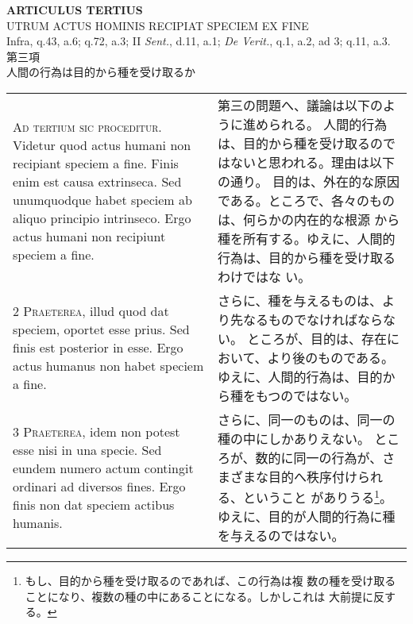 \documentclass[10pt]{jsarticle} %
\begin{document}
\begin{center}
 {\Large {\bf ARTICULUS TERTIUS}}\\
 {\large UTRUM ACTUS HOMINIS RECIPIAT SPECIEM EX FINE}\\
 {\footnotesize Infra, q.43, a.6; q.72, a.3; II {\itshape Sent.}, d.11,
 a.1; {\itshape De Verit.}, q.1, a.2, ad 3; q.11, a.3.}\\
 {\Large 第三項\\人間の行為は目的から種を受け取るか}
\end{center}

\begin{longtable}{p{21em}p{21em}}


{\Huge A}{\scshape d tertium sic proceditur}. Videtur quod
actus humani non recipiant speciem a fine. Finis enim est causa
extrinseca. Sed unumquodque habet speciem ab aliquo principio
intrinseco. Ergo actus humani non recipiunt speciem a fine.

&

第三の問題へ、議論は以下のように進められる。
人間的行為は、目的から種を受け取るのではないと思われる。理由は以下の通り。
目的は、外在的な原因である。ところで、各々のものは、何らかの内在的な根源
 から種を所有する。ゆえに、人間的行為は、目的から種を受け取るわけではな
 い。

\\


{\scshape 2 Praeterea}, illud quod dat speciem,
oportet esse prius. Sed finis est posterior in esse. Ergo actus humanus
non habet speciem a fine.

&


さらに、種を与えるものは、より先なるものでなければならない。
ところが、目的は、存在において、より後のものである。
ゆえに、人間的行為は、目的から種をもつのではない。

\\


{\scshape 3 Praeterea}, idem non potest esse nisi in
una specie. Sed eundem numero actum contingit ordinari ad diversos
fines. Ergo finis non dat speciem actibus humanis.

&

さらに、同一のものは、同一の種の中にしかありえない。
ところが、数的に同一の行為が、さまざまな目的へ秩序付けられる、ということ
 がありうる\footnote{もし、目的から種を受け取るのであれば、この行為は複
 数の種を受け取ることになり、複数の種の中にあることになる。しかしこれは
 大前提に反する。}。ゆえに、目的が人間的行為に種を与えるのではない。


\\



\end{longtable}
\end{document}
